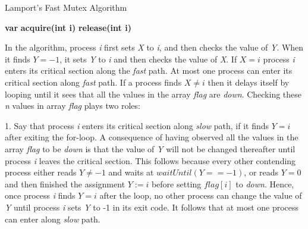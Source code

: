 \documentclass[twoside]{article}
\begin{document}
\begin{algorithm}
\caption{Lamport's Fast Mutex Algorithm}\label{lamportFast}
\begin{algorithmic}[1]
\State \textbf{var}
\Indent
\State {}
\State {}
\EndIndent
\newline
\State \textbf{acquire(int i)}
\State \text{\{}
\Indent
\State {}
\Indent
	\State {} \text{=} 
    \State {} \text{=} 
    \State {} 
	\Indent
		\State {} \text{=} 
        \State {}
        \State {}
	\EndIndent
    \State {}
    \Indent
    	\State {} \text{=} 
        \State {} 
        \State {} 
        \Indent 
        	\State {} \text{=} 
            \State {}
            \State {} 
            \State {}
            \Indent
            	\State {}
                \State {}
            \EndIndent
        \EndIndent 
    \EndIndent 
\EndIndent
\EndIndent
\State \text{\}}
\newline
\State \textbf{release(int i)}
\State \text{\{}
\Indent
	\State {} \text{=} 
    \State {} \text{=} 
\EndIndent
\State \text{\}}
\end{algorithmic}
\end{algorithm}


In the algorithm, process {\it i} first sets {\it X} to {\it i}, and then checks the value of {\it Y}. When it finds $Y = -1$, it sets {\it Y} to {\it i} and then checks the value of {\it X}. If $X = i$ process {\it i} enters its critical section along the {\it fast} path. At most one process can enter its critical section along {\it fast} path. If a process finds $X \neq i$ then it delays itself by looping until it sees that all the values in the array {\it flag} are {\it down}. Checking these {\it n} values in array {\it flag} plays two roles:

\setlength{\parindent}{2em} 1. Say that process {\it i} enters its critical section along {\it slow} path, if it finds $Y = i$ after exiting the for-loop. A consequence of having observed all the values in the array {\it flag} to be {\it down} is that the value of {\it Y} will not be changed thereafter until process {\it i} leaves the critical section. This follows because every other contending process either reads $Y \neq -1$ and waits at $waitUntil(Y == -1)$, or reads $Y = 0$ and then finished the assignment $Y := i$ before setting $flag[i]$ to {\it down}. Hence, once process {\it i} finds $Y = i$ after the loop, no other process can change the value of {\it Y} until process {\it i} sets {\it Y} to -1 in its exit code. It follows that at most one process can enter along {\it slow} path.
\end{document}

